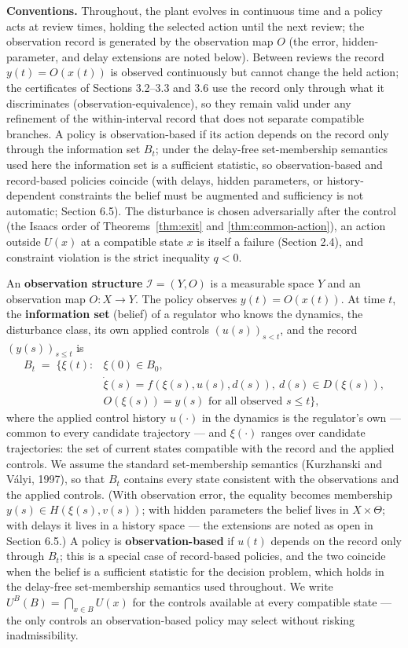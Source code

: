 \documentclass[10pt,twocolumn]{article}
\theoremstyle{definition}
\begin{document}
\textbf{Conventions.} Throughout, the plant evolves in continuous time
and a policy acts at review times, holding the selected action until the
next review; the observation record is generated by the observation map
\(O\) (the error, hidden-parameter, and delay extensions are noted
below). Between reviews the record \(y(t)=O(x(t))\) is observed
continuously but cannot change the held action; the certificates of
Sections 3.2--3.3 and 3.6 use the record only through what it discriminates
(observation-equivalence), so they remain valid under any refinement of
the within-interval record that does not separate compatible branches.
A policy is observation-based if its action depends on the
record only through the information set \(B_t\); under the delay-free
set-membership semantics used here the information set is a sufficient
statistic, so observation-based and record-based policies coincide (with
delays, hidden parameters, or history-dependent constraints the belief
must be augmented and sufficiency is not automatic; Section 6.5). The disturbance
is chosen adversarially after the control (the Isaacs order of
Theorems~\ref{thm:exit} and \ref{thm:common-action}), an action outside
\(U(x)\) at a compatible state \(x\) is itself a failure (Section 2.4),
and constraint violation is the strict inequality \(q<0\).

An \textbf{observation structure} \(\mathcal{I} = (Y, O)\) is a
measurable space \(Y\) and an observation map \(O : X \to Y\). The
policy observes \(y(t) = O(x(t))\). At time \(t\), the
\textbf{information set} (belief) of a regulator who knows the dynamics,
the disturbance class, its own applied controls \((u(s))_{s<t}\), and the record \((y(s))_{s \le t}\) is
\[
\begin{aligned}
B_t \;=\; \bigl\{ \xi(t) : {}& \xi(0) \in B_0,\\
& \dot\xi(s) = f(\xi(s), u(s), d(s)),\ d(s) \in D(\xi(s)),\\
& O(\xi(s)) = y(s) \text{ for all observed } s \le t \bigr\},
\end{aligned}
\]
where the applied control history \(u(\cdot)\) in the dynamics is
the regulator's own --- common to every candidate trajectory --- and
\(\xi(\cdot)\) ranges over candidate trajectories: the set of current
states compatible with the record and the applied controls. We assume the standard set-membership semantics (Kurzhanski and V\'alyi, 1997), so that \(B_t\) contains every state
consistent with the observations and the applied controls. (With
observation error, the equality becomes membership
\(y(s) \in H(\xi(s), v(s))\); with hidden parameters the belief lives in
\(X \times \Theta\); with delays it lives in a history space --- the extensions are noted as open in Section 6.5.) A policy is
\textbf{observation-based} if \(u(t)\) depends on the record only
through \(B_t\); this is a special case of record-based policies, and
the two coincide when the belief is a sufficient statistic for the
decision problem, which holds in the delay-free set-membership semantics used
throughout. We write \(U^B(B) = \bigcap_{x \in B} U(x)\) for the
controls available at every compatible state --- the only controls an
observation-based policy may select without risking inadmissibility.
\end{document}
